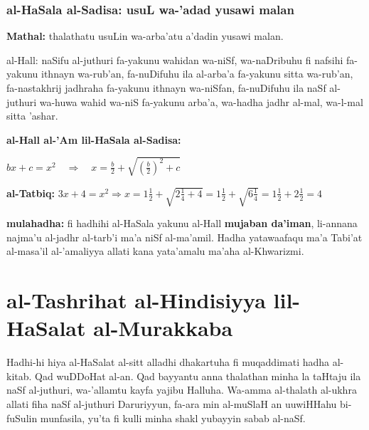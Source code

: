\documentclass[11pt,a4paper]{book}
\begin{document}
\newpage

\subsection{al-HaSala al-Sadisa: usuL wa-'adad yusawi malan}

\begin{originaltext}
\textbf{Mathal:} thalathatu usuLin wa-arba'atu a'dadin yusawi malan.

al-Hall: naSifu al-juthuri fa-yakunu wahidan wa-niSf, wa-naDribuhu fi
nafsihi fa-yakunu ithnayn wa-rub'an, fa-nuDifuhu ila al-arba'a fa-yakunu
sitta wa-rub'an, fa-nastakhrij jadhraha fa-yakunu ithnayn wa-niSfan,
fa-nuDifuhu ila naSf al-juthuri wa-huwa wahid wa-niS fa-yakunu
arba'a, wa-hadha jadhr al-mal, wa-l-mal sitta 'ashar.
\end{originaltext}

\begin{mathexplain}
\textbf{al-Hall al-'Am lil-HaSala al-Sadisa:}

\begin{center}
$\boxed{bx + c = x^2 \quad\Longrightarrow\quad x = \frac{b}{2} + \sqrt{\left(\frac{b}{2}\right)^2 + c}}$
\end{center}

\textbf{al-Tatbiq:}
$3x + 4 = x^2 \Rightarrow x = 1\tfrac{1}{2} + \sqrt{2\tfrac{1}{4} + 4} = 1\tfrac{1}{2} + \sqrt{6\tfrac{1}{4}} = 1\tfrac{1}{2} + 2\tfrac{1}{2} = 4$

\textbf{mulahadha:} fi hadhihi al-HaSala yakunu al-Hall \textbf{mujaban
da'iman}, li-annana najma'u al-jadhr al-tarb'i ma'a niSf al-ma'amil.
Hadha yatawaafaqu ma'a Tabi'at al-masa'il al-'amaliyya allati kana
yata'amalu ma'aha al-Khwarizmi.
\end{mathexplain}

\newpage

\chapter{al-Tashrihat al-Hindisiyya lil-HaSalat al-Murakkaba}
\label{ch:geom}

\begin{originaltext}
Hadhi-hi hiya al-HaSalat al-sitt alladhi dhakartuha fi muqaddimati
hadha al-kitab. Qad wuDDoHat al-an. Qad bayyantu anna thalathan minha
la taHtaju ila naSf al-juthuri, wa-'allamtu kayfa yajibu Halluha. Wa-amma
al-thalath al-ukhra allati fiha naSf al-juthuri Daruriyyun, fa-ara min
al-muSlaH an uuwiHHahu bi-fuSulin munfasila, yu'ta fi kulli minha
shakl yubayyin sabab al-naSf.
\end{originaltext}
\end{document}
